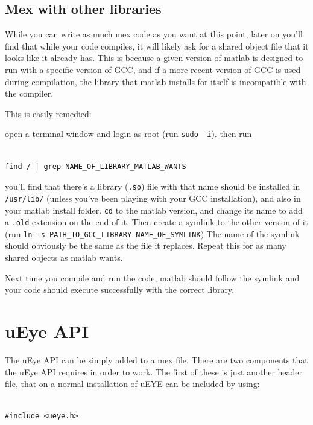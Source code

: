 \documentclass[12pt,a4paper]{article}
\begin{document}
\subsection{Mex with other libraries}

While you can write as much mex code as you want at this point, later on you'll find that while your code compiles, it will likely ask for a shared object file that it looks like it already has. This is because a given version of matlab is designed to run with a specific version of GCC, and if a more recent version of GCC is used during compilation, the library that matlab installs for itself is incompatible with the compiler.

This is easily remedied: 

open a terminal window and login as root (run \texttt{sudo -i}). then run

\lstset{language=bash}
\begin{lstlisting}

find / | grep NAME_OF_LIBRARY_MATLAB_WANTS

\end{lstlisting}

you'll find that there's a library (\texttt{.so}) file with that name should be installed in \texttt{/usr/lib/} (unless you've been playing with your GCC installation), and also in your matlab install folder. \texttt{cd} to the matlab version, and change its name to add a \texttt{.old} extension on the end of it. Then create a symlink to the other version of it (run \texttt{ln -s PATH\_TO\_GCC\_LIBRARY NAME\_OF\_SYMLINK}) The name of the symlink should obviously be the same as the file it replaces. Repeat this for as many shared objects as matlab wants.

Next time you compile and run the code, matlab should follow the symlink and your code should execute successfully with the correct library.


\section{uEye API}

The uEye API can be simply added to a mex file. There are two components that the uEye API requires in order to work. The first of these is just another header file, that on a normal installation of uEYE can be included by using:

\lstset{language=C++}
\begin{lstlisting}

#include <ueye.h>

\end{lstlisting}
\end{document}
